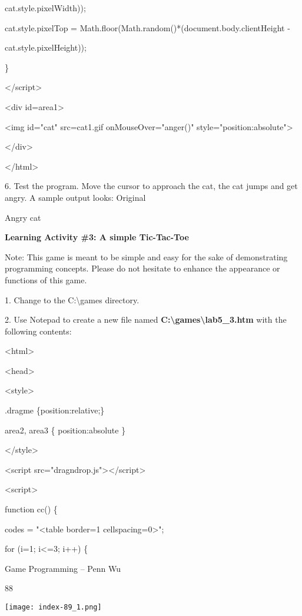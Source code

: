 \documentclass[
]{article}
\begin{document}
cat.style.pixelWidth));

cat.style.pixelTop =
Math.floor(Math.random()*(document.body.clientHeight -

cat.style.pixelHeight));

\}

\textless/script\textgreater{}

\textless div id=area1\textgreater{}

\textless img id="cat" src=cat1.gif onMouseOver="anger()"
style="position:absolute"\textgreater{}

\textless/div\textgreater{}

\textless/html\textgreater{}

6. Test the program. Move the cursor to approach the cat, the cat jumps
and get angry. A sample output looks: Original

Angry cat

\textbf{Learning Activity \#3: A simple Tic-Tac-Toe}

Note: This game is meant to be simple and easy for the sake of
demonstrating programming concepts. Please do not hesitate to enhance
the appearance or functions of this game.

1. Change to the C:\textbackslash games directory.

2. Use Notepad to create a new file named
\textbf{C:\textbackslash games\textbackslash lab5\_3.htm} with the
following contents:

\textless html\textgreater{}

\textless head\textgreater{}

\textless style\textgreater{}

.dragme \{position:relative;\}

area2, area3 \{ position:absolute \}

\textless/style\textgreater{}

\textless script
src="dragndrop.js"\textgreater\textless/script\textgreater{}

\textless script\textgreater{}

function cc() \{

codes = "\textless table border=1 cellspacing=0\textgreater";

for (i=1; i\textless=3; i++) \{

Game Programming -- Penn Wu

88

\protect\hypertarget{index_split_006.htmlux5cux23p89}{}{}\texttt{[image: index-89\_1.png]}
\end{document}
